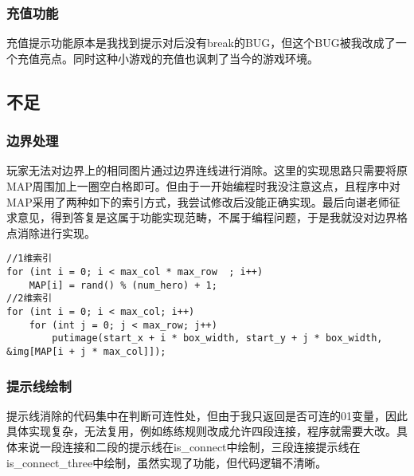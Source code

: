 \subsubsection{充值功能}
充值提示功能原本是我找到提示对后没有break的BUG，但这个BUG被我改成了一个充值亮点。同时这种小游戏的充值也讽刺了当今的游戏环境。


\subsection{不足}
\subsubsection{边界处理}
玩家无法对边界上的相同图片通过边界连线进行消除。这里的实现思路只需要将原MAP周围加上一圈空白格即可。但由于一开始编程时我没注意这点，且程序中对MAP采用了两种如下的索引方式，我尝试修改后没能正确实现。最后向谌老师征求意见，得到答复是这属于功能实现范畴，不属于编程问题，于是我就没对边界格点消除进行实现。

\lstset{language=C}
\begin{lstlisting}
//1维索引
for (int i = 0; i < max_col * max_row  ; i++) 
    MAP[i] = rand() % (num_hero) + 1;
//2维索引
for (int i = 0; i < max_col; i++)
    for (int j = 0; j < max_row; j++) 
        putimage(start_x + i * box_width, start_y + j * box_width, &img[MAP[i + j * max_col]]);
\end{lstlisting}

\subsubsection{提示线绘制}
提示线消除的代码集中在判断可连性处，但由于我只返回是否可连的01变量，因此具体实现复杂，无法复用，例如练练规则改成允许四段连接，程序就需要大改。具体来说一段连接和二段的提示线在is\_connect中绘制，三段连接提示线在is\_connect\_three中绘制，虽然实现了功能，但代码逻辑不清晰。